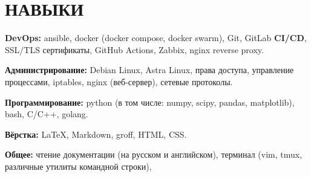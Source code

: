 \section{НАВЫКИ}

\begin{description}

  \setlength\itemsep{-0.4em}

\item{\bfseries DevOps:} ansible, docker (docker compose, docker
  swarm), Git, GitLab \textbf{CI/CD}, SSL/TLS сертификаты, GitHub
  Actions, Zabbix, nginx reverse proxy.

\item{\bfseries Администрирование:} Debian Linux, Astra Linux, права
  доступа, управление процессами, iptables, nginx (веб-сервер),
  сетевые протоколы.
    
\item{\bfseries Программирование:} python (в том числе: numpy, scipy,
  pandas, matplotlib), bash, C/C++, golang.
    
\item{\bfseries Вёрстка:} \LaTeX, Markdown, groff, HTML, CSS.

\item{\bfseries Общее:} чтение документации (на русском и английском),
  терминал (vim, tmux, различные утилиты командной строки), 
  
\end{description}
    
\vspace{.7em}
